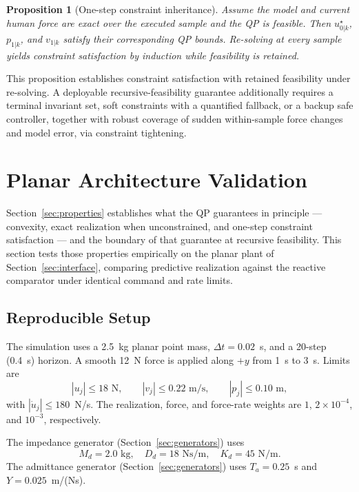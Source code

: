 \documentclass[journal]{IEEEtran}
\newtheorem{proposition}{Proposition}
\begin{document}
\begin{proposition}[One-step constraint inheritance]
\label{prop:inheritance}
Assume the model and current human force are exact over the executed
sample and the QP is feasible. Then $u_{0|k}^\star$, $p_{1|k}$, and
$v_{1|k}$ satisfy their corresponding QP bounds. Re-solving at every
sample yields constraint satisfaction by induction while feasibility is
retained.
\end{proposition}

This proposition establishes constraint satisfaction with retained
feasibility under re-solving. A deployable recursive-feasibility
guarantee additionally requires a terminal invariant set, soft
constraints with a quantified fallback, or a backup safe controller,
together with robust coverage of sudden within-sample force changes and
model error, via
constraint tightening.

\section{Planar Architecture Validation}
\label{sec:planar}

Section~\ref{sec:properties} establishes what the QP guarantees in
principle --- convexity, exact realization when unconstrained, and
one-step constraint satisfaction --- and the boundary of that guarantee
at recursive feasibility. This section tests those properties empirically on the
planar plant of Section~\ref{sec:interface}, comparing predictive
realization against the reactive comparator under identical command and
rate limits.

\subsection{Reproducible Setup}

The simulation uses a 2.5~kg planar point mass, $\Delta t=0.02$~s, and a
20-step (0.4~s) horizon. A smooth 12~N force is applied along $+y$ from
1~s to 3~s. Limits are
\begin{equation}
|u_j|\le18\text{ N},\qquad |v_j|\le0.22\text{ m/s},\qquad
|p_j|\le0.10\text{ m},
\end{equation}
with $|\dot u_j|\le180$~N/s. The realization, force, and force-rate
weights are $1$, $2\times10^{-4}$, and $10^{-3}$, respectively.

The impedance generator (Section~\ref{sec:generators}) uses
\begin{equation}
M_d=2.0\text{ kg},\quad D_d=18\text{ Ns/m},\quad K_d=45\text{ N/m}.
\end{equation}
The admittance generator (Section~\ref{sec:generators}) uses
$T_a=0.25$~s and $Y=0.025$~m/(Ns).
\end{document}
